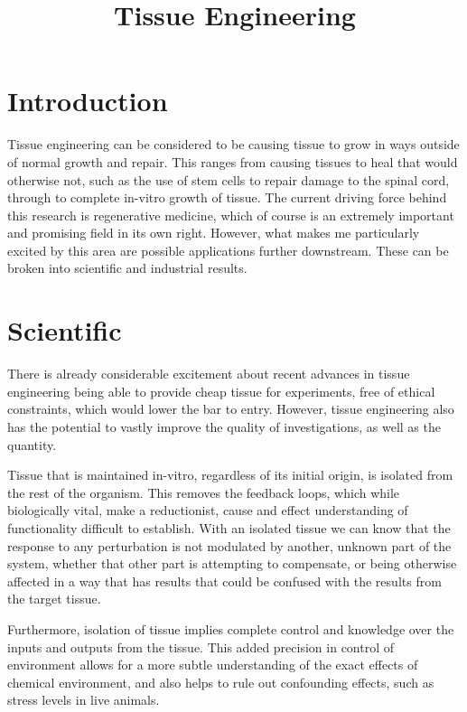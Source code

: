 \documentclass[12pt,a4paper,twocolumn]{article}
\begin{document}
\title{\vspace{-3em}Tissue Engineering\vspace{-3em}}
\date{}
\maketitle

\thispagestyle{empty}

\section{Introduction}
Tissue engineering can be considered to be causing tissue to grow in ways outside of normal growth and repair. This ranges from causing tissues to heal that would otherwise not, such as the use of stem cells to repair damage to the spinal cord, through to complete in-vitro growth of tissue. The current driving force behind this research is regenerative medicine, which of course is an extremely important and promising field in its own right. However, what makes me particularly excited by this area are possible applications further downstream. These can be broken into scientific and industrial results.

\section{Scientific}
There is already considerable excitement about recent advances in tissue engineering being able to provide cheap tissue for experiments, free of ethical constraints, which would lower the bar to entry. However, tissue engineering also has the potential to vastly improve the quality of investigations, as well as the quantity. 

Tissue that is maintained in-vitro, regardless of its initial origin, is isolated from the rest of the organism. This removes the feedback loops, which while biologically vital, make a reductionist, cause and effect understanding of functionality difficult to establish. With an isolated tissue we can know that the response to any perturbation is not modulated by another, unknown part of the system, whether that other part is attempting to compensate, or being otherwise affected in a way that has results that could be confused with the results from the target tissue.

Furthermore, isolation of tissue implies complete control and knowledge over the inputs and outputs from the tissue. This added precision in control of environment allows for a more subtle understanding of the exact effects of chemical environment, and also helps to rule out confounding effects, such as stress levels in live animals.
\end{document}
